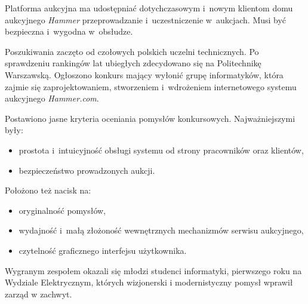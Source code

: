 \documentclass[10pt,a4paper]{article}
\begin{document}
Platforma aukcyjna ma udostępniać dotychczasowym i~nowym klientom domu
aukcyjnego \emph{Hammer} przeprowadzanie i~uczestniczenie w~aukcjach. Musi być
bezpieczna i~wygodna w~obsłudze.

Poszukiwania zaczęto od czołowych polskich uczelni technicznych. Po sprawdzeniu
rankingów lat ubiegłych zdecydowano się na Politechnikę Warszawską. Ogłoszono
konkurs mający wyłonić grupę informatyków, która zajmie się zaprojektowaniem,
stworzeniem i~wdrożeniem internetowego systemu aukcyjnego \emph{Hammer.com}.

\noindent Postawiono jasne kryteria oceniania pomysłów konkursowych.
Najważniejszymi były:
\begin{itemize}
  \item prostota i~intuicyjność obsługi systemu od strony pracowników oraz
    klientów,
  \item bezpieczeństwo prowadzonych aukcji.
\end{itemize}
Położono też nacisk na:
\begin{itemize}
  \item oryginalność pomysłów,
  \item wydajność i~małą złożoność wewnętrznych mechanizmów serwisu aukcyjnego,
  \item czytelność graficznego interfejsu użytkownika.
\end{itemize}   

Wygranym zespołem okazali się młodzi studenci informatyki, pierwszego roku na
Wydziale Elektrycznym, których wizjonerski i modernistyczny pomysł wprawił
zarząd w zachwyt.
\end{document}

